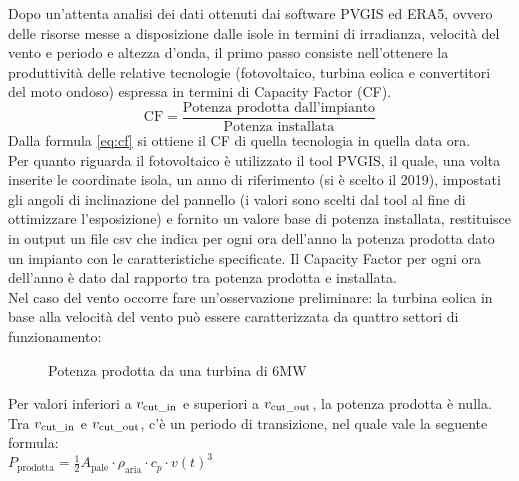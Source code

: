\documentclass[fleqn,10pt]{SelfArx} %
\begin{document}
Dopo un'attenta analisi dei dati ottenuti dai software PVGIS ed ERA5, ovvero delle risorse messe a
disposizione dalle isole in termini di irradianza, velocità del vento e periodo e altezza d'onda, il
primo passo consiste nell'ottenere la produttività delle relative tecnologie (fotovoltaico, turbina
eolica e convertitori del moto ondoso) espressa in termini di Capacity Factor (CF).
\begin{equation}
	\text{CF} = \frac{\text{Potenza prodotta dall'impianto}}{\text{Potenza installata}}
	\label{eq:cf}
\end{equation}
Dalla formula \ref{eq:cf} si ottiene il CF di quella tecnologia in quella data ora. \\
Per quanto riguarda il fotovoltaico è utilizzato il tool PVGIS, il quale, una volta inserite le
coordinate isola, un anno di riferimento (si è scelto il 2019), impostati gli angoli di inclinazione del
pannello (i valori sono scelti dal tool al fine di ottimizzare l'esposizione) e fornito un valore base di
potenza installata, restituisce in output un file csv che indica per ogni ora dell'anno la potenza
prodotta dato un impianto con le caratteristiche specificate. 
Il Capacity Factor per ogni ora dell'anno è dato dal rapporto tra potenza prodotta e installata. \\
Nel caso del vento occorre fare un'osservazione preliminare:
la turbina eolica in base alla velocità del vento può essere caratterizzata da quattro settori di
funzionamento: \\ 
\begin{figure}[H]\centering
	\caption{Potenza prodotta da una turbina di $6 \text{MW}$}
	\label{fig:results}
\end{figure}Per valori inferiori a \(v_{\text{cut\_in}}\) e superiori a \(v_{\text{cut\_out}}\), la potenza prodotta è nulla. \\
Tra \(v_{\text{cut\_in}}\) e \(v_{\text{cut\_out}}\), c'è un periodo di transizione, nel quale vale la seguente formula: \\
\(P_{\text{prodotta}} = \frac{1}{2} A_{\text{pale}} \cdot \rho_{\text{aria}} \cdot c_p \cdot v(t)^3 \) \\
\end{document}
